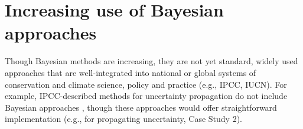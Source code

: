 \documentclass{article}
\begin{document}

\section* {Increasing use of Bayesian approaches}
\par Though Bayesian methods are increasing, they are not yet standard, widely used approaches that are well-integrated into national or global systems of conservation and climate science, policy and practice (e.g., IPCC, IUCN). For example, IPCC-described methods for uncertainty propagation do not include Bayesian approaches \citep{ipcc2007}, though these approaches would offer straightforward implementation (e.g., for propagating uncertainty, Case Study 2). 
\end{document}
